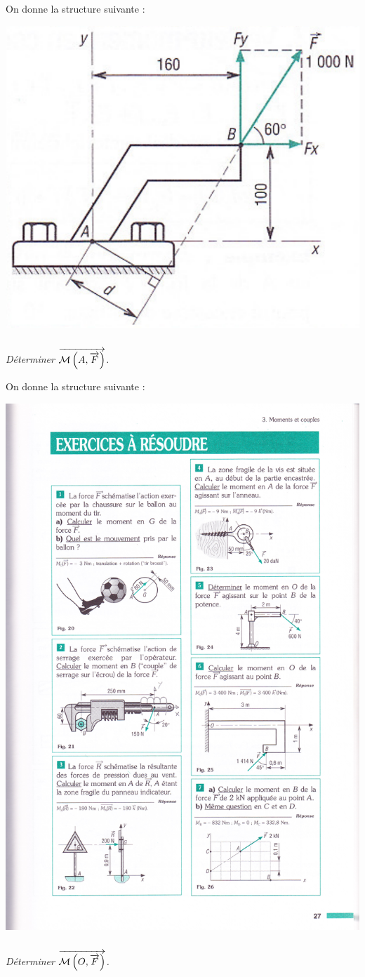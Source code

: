 \documentclass[10pt,fleqn]{book} %
\begin{document}
\begin{multicols}{2}
\setcounter{subparagraph}{0}
On donne la structure suivante : 
\begin{center}
\includegraphics[width=.8\linewidth]{images/fig_04}
\end{center}


\subparagraph{}
\textit{Déterminer $\overrightarrow{\mathcal{M}\left(A,\overrightarrow{F} \right)}$.}



On donne la structure suivante : 
\begin{center}
\includegraphics[width=.8\linewidth]{images/fig_05}
\end{center}


\subparagraph{}
\textit{Déterminer $\overrightarrow{\mathcal{M}\left(O,\overrightarrow{F} \right)}$.}
\end{multicols}
\end{document}
